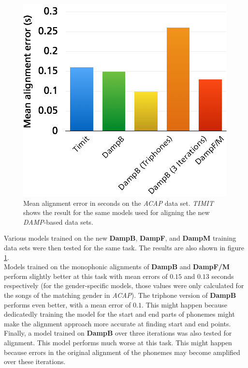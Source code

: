 \begin{figure}
	\begin{center}
		\includegraphics[width=.4\textwidth]{images/res_alignment.png}
		\caption{Mean alignment error in seconds on the \textit{ACAP} data set. \textit{TIMIT} shows the result for the same models used for aligning the new \textit{DAMP}-based data sets.}
		\label{fig:res_alignment}
	\end{center}
\end{figure}


Various models trained on the new \textbf{DampB}, \textbf{DampF}, and \textbf{DampM} training data sets were then tested for the same task. The results are also shown in figure \ref{fig:res_alignment}.\\
Models trained on the monophonic alignments of \textbf{DampB} and \textbf{DampF/M} perform slightly better at this task with mean errors of $0.15$ and $0.13$ seconds respectively (for the gender-specific models, those values were only calculated for the songs of the matching gender in \textit{ACAP}). The triphone version of \textbf{DampB} performs even better, with a mean error of $0.1$. This might happen because dedicatedly training the model for the start and end parts of phonemes might make the alignment approach more accurate at finding start and end points.\\
Finally, a model trained on \textbf{DampB} over three iterations was also tested for alignment. This model performs much worse at this task. This might happen because errors in the original alignment of the phonemes may become amplified over these iterations.


